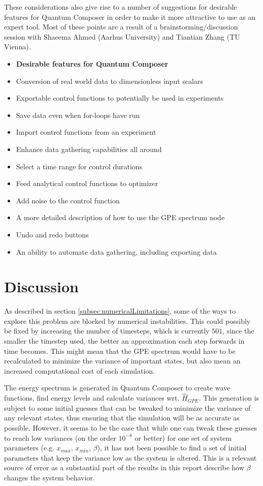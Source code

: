 \documentclass[a4paper, twocolumn]{revtex4-1}
\begin{document}
These considerations also give rise to a number of suggestions for desirable features for Quantum Composer in order to make it more attractive to use as an expert tool. Most of these points are a result of a brainstorming/discussion session with Shaeema Ahmed (Aarhus University) and Tiantian Zhang (TU Vienna).

\begin{itemize}
	\item[] \textbf{Desirable features for Quantum Composer} 
	\item Conversion of real world data to dimensionless input scalars
	\item Exportable control functions to potentially be used in experiments
	\item Save data even when for-loops have run
	\item Import control functions from an experiment
	\item Enhance data gathering capabilities all around
	\item Select a time range for control durations
	\item Feed analytical control functions to  optimizer
	\item Add noise to the control function
	\item A more detailed description of how to use the GPE spectrum node
	\item Undo and redo buttons
	\item An ability to automate data gathering, including exporting data
\end{itemize}

\section{Discussion}\label{sec:discussion}
As described in section \ref{subsec:numericalLimitations}, some of the ways to explore this problem are blocked by numerical instabilities. This could possibly be fixed by increasing the number of timesteps, which is currently $501$, since the smaller the timestep used, the better an approximation each step forwards in time becomes. This might mean that the GPE spectrum would have to be recalculated to minimize the variance of important states, but also mean an increased computational cost of each simulation.

The energy spectrum is generated in Quantum Composer to create wave functions, find energy levels and calculate variances wrt. $\hat{H}_{GPE}$. This generation is subject to some initial guesses that can be tweaked to minimize the variance of any relevant states, thus ensuring that the simulation will be as accurate as possible. However, it seems to be the case that while one can tweak these guesses to reach low variances (on the order $10^{-8}$ or better) for one set of system parameters (e.g. $x_{max}$, $x_{min}$, $\beta$), it has not been possible to find a set of initial parameters that keep the variance low as the system is altered. This is a relevant source of error as a substantial part of the results in this report describe how $\beta$ changes the system behavior. 
\end{document}
